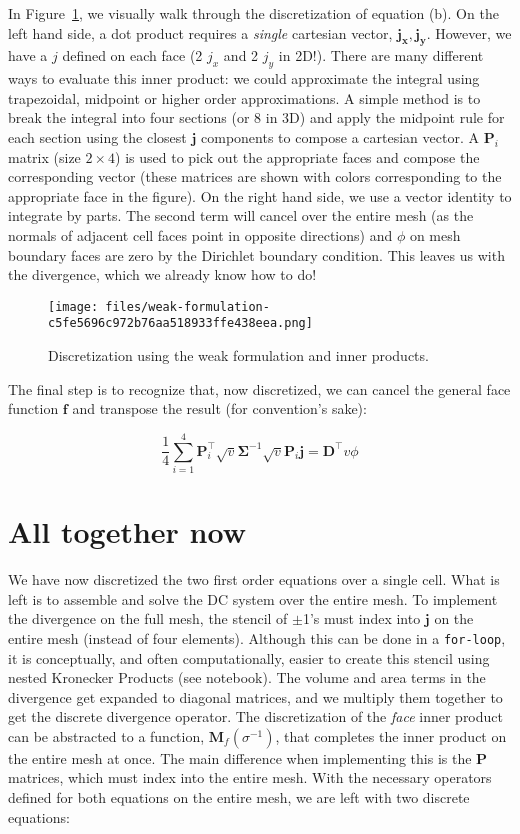 \documentclass[Journal,InsideFigs,DoubleSpace,12pt,letterpaper]{ascelike-new}
\begin{document}
In Figure~\ref{fig-weak-formulation}, we visually walk through the discretization of equation (b). On the left hand side, a dot product requires a \textit{single} cartesian vector, $\mathbf{j_x, j_y}$. However, we have a $j$ defined on each face (2 $j_x$ and 2 $j_y$ in 2D!). There are many different ways to evaluate this inner product: we could approximate the integral using trapezoidal, midpoint or higher order approximations. A simple method is to break the integral into four sections (or 8 in 3D) and apply the midpoint rule for each section using the closest $\mathbf{j}$ components to compose a cartesian vector. A $\mathbf{P}_i$ matrix (size $2 \times 4$) is used to pick out the appropriate faces and compose the corresponding vector (these matrices are shown with colors corresponding to the appropriate face in the figure). On the right hand side, we use a vector identity to integrate by parts. The second term will cancel over the entire mesh (as the normals of adjacent cell faces point in opposite directions) and $\phi$ on mesh boundary faces are zero by the Dirichlet boundary condition. This leaves us with the divergence, which we already know how to do!

\begin{figure}[!htbp]
\centering
\texttt{[image: files/weak-formulation-c5fe5696c972b76aa518933ffe438eea.png]}
\caption{Discretization using the weak formulation and inner products.}
\label{fig-weak-formulation}
\end{figure}

The final step is to recognize that, now discretized, we can cancel the general face function $\mathbf{f}$ and transpose the result (for convention's sake):

\begin{equation}
\frac{1}{4} \sum_{i=1}^4 \mathbf{P}_i^\top \sqrt{v} \mathbf{\Sigma}^{-1} \sqrt{v} \mathbf{P}_i \mathbf{j} = \mathbf{D}^\top v \phi
\end{equation}

\section{All together now}\label{All together now}

We have now discretized the two first order equations over a single cell. What is left is to assemble and solve the DC system over the entire mesh. To implement the divergence on the full mesh, the stencil of $\pm$1's must index into $\mathbf{j}$ on the entire mesh (instead of four elements). Although this can be done in a \texttt{for-loop}, it is conceptually, and often computationally, easier to create this stencil using nested Kronecker Products (see notebook). The volume and area terms in the divergence get expanded to diagonal matrices, and we multiply them together to get the discrete divergence operator. The discretization of the \textit{face} inner product can be abstracted to a function, $\mathbf{M}_f(\sigma^{ -1})$, that completes the inner product on the entire mesh at once. The main difference when implementing this is the $\mathbf{P}$ matrices, which must index into the entire mesh. With the necessary operators defined for both equations on the entire mesh, we are left with two discrete equations:
\end{document}
